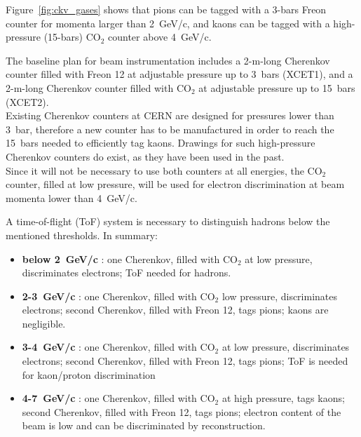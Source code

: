  Figure~\ref{fig:ckv_gases} shows that pions can be tagged with a 3-bars Freon counter for momenta larger than 2~GeV/c, and kaons can be tagged with a high-pressure  (15-bars) CO$_2$  counter above 4~GeV/c.

The baseline plan for beam instrumentation includes a 2-m-long
Cherenkov  counter filled with Freon 12 at adjustable pressure up to
3~bars (XCET1), and a  2-m-long  
 Cherenkov  counter filled with CO$_2$ at adjustable pressure up to
 15~bars (XCET2).\\
Existing Cherenkov counters at CERN are designed for pressures lower than  3~bar, therefore a new counter has to be manufactured in order to reach the 15~bars needed to efficiently tag kaons. Drawings for such high-pressure Cherenkov counters do exist, as they have been %
used in the past. \\
%
Since it will not be necessary to use both counters at all energies, the CO$_2$
counter, filled at low pressure,  will be used for electron discrimination at beam momenta lower
than 4~GeV/c.  

A time-of-flight (ToF) system  is  necessary   to distinguish hadrons below the mentioned thresholds.
%
In summary:
\begin{itemize}
\item {\bf below 2~GeV/c} : one Cherenkov, filled with CO$_2$ at low
  pressure, discriminates electrons; ToF needed for hadrons.
\item {\bf 2-3~GeV/c} : one Cherenkov, filled with CO$_2$ low
  pressure, discriminates electrons; second Cherenkov, filled with
  Freon 12, tags pions; kaons are negligible.
\item {\bf 3-4~GeV/c} : one Cherenkov, filled with CO$_2$ at low
  pressure, discriminates electrons; second  Cherenkov, filled with
  Freon 12, tags pions; ToF is needed for kaon/proton discrimination
\item {\bf 4-7~GeV/c} : one Cherenkov, filled with CO$_2$ at high
  pressure, tags kaons; second  Cherenkov, filled with
  Freon 12, tags pions; electron content of the beam is low and can be
  discriminated by reconstruction.
\end{itemize}


